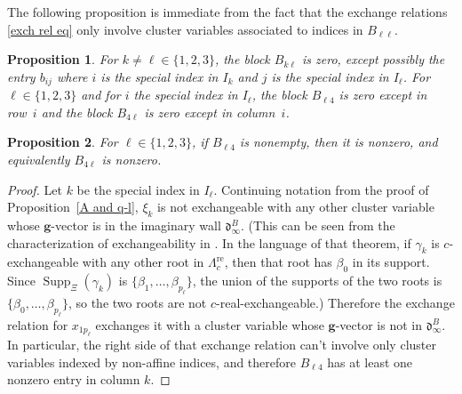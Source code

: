 \documentclass{amsart}
\newtheorem{proposition}{Proposition}[section]
\theoremstyle{definition}
\theoremstyle{remark}
\numberwithin{equation}{section}
\newcommand{\set}[1]{{\lbrace #1 \rbrace}}
\newcommand{\0}{{\mathbf{0}}}
\newcommand{\g}{\mathbf{g}}
\newcommand{\re}{\mathrm{re}}
\renewcommand{\d}{{\mathfrak d}}
\newcommand{\SimplesTChar}{\Xi}
\newcommand{\SuppT}{\operatorname{Supp}_\SimplesTChar}
\newcommand{\APTChar}{\Lambda}
\newcommand{\APT}[1]{\APTChar_{#1}}
\newcommand{\APTre}[1]{\APT{#1}^\re}
\begin{document}
The following proposition is immediate from the fact that the exchange relations \eqref{exch rel eq} only involve cluster variables associated to indices in $B_{\ell\ell}$.

\begin{proposition}\label{mostly zeros}
For  $k\neq\ell\in\set{1,2,3}$, the block $B_{k\ell}$ is zero, except possibly the entry $b_{ij}$ where $i$ is the special index in $I_k$ and $j$ is the special index in $I_\ell$.
For $\ell\in\set{1,2,3}$ and for $i$ the special index in $I_\ell$, the block $B_{\ell4}$ is zero except in row~$i$ and the block $B_{4\ell}$ is zero except in column~$i$.
\end{proposition}

\begin{proposition}\label{not all zeros}
For $\ell\in\set{1,2,3}$, if $B_{\ell4}$ is nonempty, then it is nonzero, and equivalently $B_{4\ell}$ is nonzero.
\end{proposition}
\begin{proof}
Let $k$ be the special index in $I_\ell$.
Continuing notation from the proof of Proposition~\ref{A and q-l}, $\xi_k$ is not exchangeable with any other cluster variable whose $\g$-vector is in the imaginary wall $\d^B_\infty$.
(This can be seen from the characterization of exchangeability in \cite[Theorem~7.2]{affdenom}.
In the language of that theorem, if $\gamma_k$ is $c$-exchangeable with any other root in $\APTre{c}$, then that root has $\beta_0$ in its support.
Since $\SuppT(\gamma_k)$ is $\set{\beta_1,\ldots,\beta_{p_\ell}}$, the union of the supports of the two roots is $\set{\beta_0,\ldots,\beta_{p_\ell}}$, so the two roots are not $c$-real-exchangeable.)
Therefore the exchange relation for $x_{1p_\ell}$ exchanges it with a cluster variable whose $\g$-vector is not in $\d^B_\infty$.  
In particular, the right side of that exchange relation can't involve only cluster variables indexed by non-affine indices, and therefore $B_{\ell4}$ has at least one nonzero entry in column $k$.
\end{proof}
\end{document}
